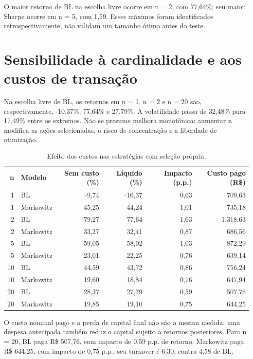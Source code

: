 O maior retorno de BL na escolha livre ocorre em n = 2, com 77,64\%; seu maior Sharpe ocorre em n = 5, com 1,59. Esses máximos foram identificados retrospectivamente, não validam um tamanho ótimo antes do teste.

\section{Sensibilidade à cardinalidade e aos custos de transação}
Na escolha livre de BL, os retornos em n = 1, n = 2 e n = 20 são, respectivamente, -10,37\%, 77,64\% e 27,79\%. A volatilidade passa de 32,48\% para 17,49\% entre os extremos. Não se presume melhora monotônica: aumentar n modifica as ações selecionadas, o risco de concentração e a liberdade de otimização.

\begin{table}[H]
\centering
\caption{Efeito dos custos nas estratégias com seleção própria.}
\label{tab:custos}
{\footnotesize
\begin{tabular}{@{}rlrrrr@{}}
\hline
n & Modelo & Sem custo (\%) & Líquido (\%) & Impacto (p.p.) & Custo pago (R\$) \\ \hline
1 & BL & -9,74 & -10,37 & 0,63 & 709,63 \\
1 & Markowitz & 45,25 & 44,24 & 1,01 & 735,18 \\
2 & BL & 79,27 & 77,64 & 1,63 & 1.318,63 \\
2 & Markowitz & 33,27 & 32,41 & 0,87 & 686,56 \\
5 & BL & 59,05 & 58,02 & 1,03 & 872,29 \\
5 & Markowitz & 23,01 & 22,25 & 0,76 & 639,14 \\
10 & BL & 44,59 & 43,72 & 0,86 & 756,24 \\
10 & Markowitz & 19,60 & 18,84 & 0,76 & 647,94 \\
20 & BL & 28,37 & 27,79 & 0,59 & 507,76 \\
20 & Markowitz & 19,85 & 19,10 & 0,75 & 644,25 \\
\hline
\end{tabular}}
\par{}
\end{table}
O custo nominal pago e a perda de capital final não são a mesma medida: uma despesa antecipada também reduz o capital sujeito a retornos posteriores. Para n = 20, BL paga R\$ 507,76, com impacto de 0,59 p.p. de retorno. Markowitz paga R\$ 644,25, com impacto de 0,75 p.p.; seu turnover é 6,30, contra 4,58 de BL.

